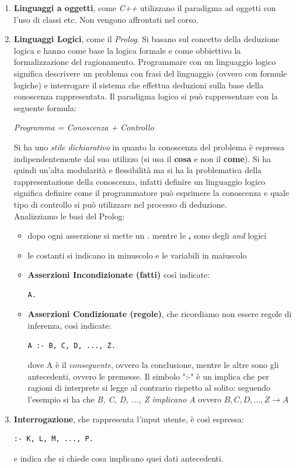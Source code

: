 \documentclass[a4paper,12pt, oneside]{book}
\begin{document}
\begin{enumerate}
	\item \textbf{Linguaggi a oggetti}, come \textit{C++} utilizzano il paradigma ad oggetti con l'uso di classi etc. Non vengono affrontati nel corso.
	\item \textbf{Linguaggi Logici}, come il \textit{Prolog}. Si basano sul concetto della deduzione logica e hanno come base la logica formale e come obbiettivo la formalizzazione del ragionamento. Programmare con un linguaggio logico significa descrivere un problema con frasi del linguaggio (ovvero con formule logiche) e interrogare il sistema che effettua deduzioni sulla base della conoscenza rappresentata. Il paradigma logico si può rappresentare con la seguente formula:
	      \begin{center}
		      \textit{Programma = Conoscenza + Controllo}
	      \end{center}
	      Si ha uno \textit{stile dichiarativo} in quanto la conoscenza del problema è espressa indipendentemente dal suo utilizzo (si usa il \textbf{cosa} e non il \textbf{come}). Si ha quindi un'alta modularità e flessibilità ma si ha la problematica della rappresentazione della conoscenza, infatti definire un linguaggio logico significa definire come il programmatore può esprimere la conoscenza e quale tipo di controllo si può utilizzare nel processo di deduzione.\\
	      Analizziamo le basi del Prolog:
	      \begin{itemize}
		      \item dopo ogni asserzione si mette un \textit{.} mentre le \textbf{,} sono degli \textit{and} logici
		      \item le costanti si indicano in minuscolo e le variabili in maiuscolo
		      \item \textbf{Asserzioni Incondizionate (fatti)} così indicate:
		            \begin{verbatim}
A.
\end{verbatim}
		      \item \textbf{Asserzioni Condizionate (regole)}, che ricordiamo non essere regole di inferenza, così indicate:
		            \begin{verbatim}
A :- B, C, D, ..., Z.
\end{verbatim}
		            dove A è il \textit{conseguente}, ovvero la conclusione, mentre le altre sono gli antecedenti, ovvero le premesse. Il simbolo ":-" è un implica che per ragioni di interprete si legge al contrario rispetto al solito: seguendo l'esempio si ha che \textit{B, C, D, ..., Z implicano A} ovvero $B, C, D, ..., Z \to A$
	      \end{itemize}
	\item \textbf{Interrogazione}, che rappresenta l'input utente, è così espressa:
	      \begin{verbatim}
:- K, L, M, ..., P.
\end{verbatim}
	      e indica che si chiede cosa implicano quei dati antecedenti.


\end{enumerate}
\end{document}
